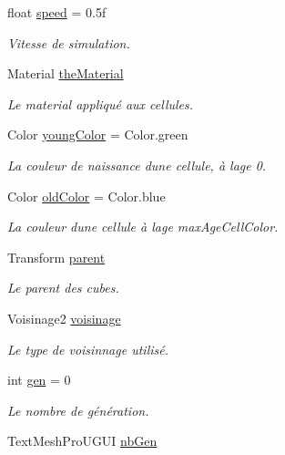 \begin{DoxyCompactItemize}
float \mbox{\hyperlink{class_simulation2_ad5211ec4fe39100128b77239da0aae3f}{speed}} = 0.\+5f
\begin{DoxyCompactList}\small\item\em Vitesse de simulation. \end{DoxyCompactList}\item 
Material \mbox{\hyperlink{class_simulation2_a2ec94d393d26bf7926018f93ef544ef0}{the\+Material}}
\begin{DoxyCompactList}\small\item\em Le material appliqué aux cellules. \end{DoxyCompactList}\item 
Color \mbox{\hyperlink{class_simulation2_a004598afd4765dd3b66ad0fb1628c8d6}{young\+Color}} = Color.\+green
\begin{DoxyCompactList}\small\item\em La couleur de naissance d\textquotesingle{}une cellule, à l\textquotesingle{}age 0. \end{DoxyCompactList}\item 
Color \mbox{\hyperlink{class_simulation2_aa0dd7ba94b0363c6de0f9d4f35db4689}{old\+Color}} = Color.\+blue
\begin{DoxyCompactList}\small\item\em La couleur d\textquotesingle{}une cellule à l\textquotesingle{}age max\+Age\+Cell\+Color. \end{DoxyCompactList}\item 
Transform \mbox{\hyperlink{class_simulation2_a19e139de68ecbb0b30e9f13bd4da6ae5}{parent}}
\begin{DoxyCompactList}\small\item\em Le parent des cubes. \end{DoxyCompactList}\item 
Voisinage2 \mbox{\hyperlink{class_simulation2_a0f278d8340b3920e0aeb9aafccf9daec}{voisinage}}
\begin{DoxyCompactList}\small\item\em Le type de voisinnage utilisé. \end{DoxyCompactList}\item 
int \mbox{\hyperlink{class_simulation2_ac69e02052c567c7f3b27cdbb141fd8ee}{gen}} = 0
\begin{DoxyCompactList}\small\item\em Le nombre de génération. \end{DoxyCompactList}\item 
Text\+Mesh\+Pro\+U\+G\+UI \mbox{\hyperlink{class_simulation2_aed7deed0c048995375e87ba8ee74955c}{nb\+Gen}}

\end{DoxyCompactItemize}
